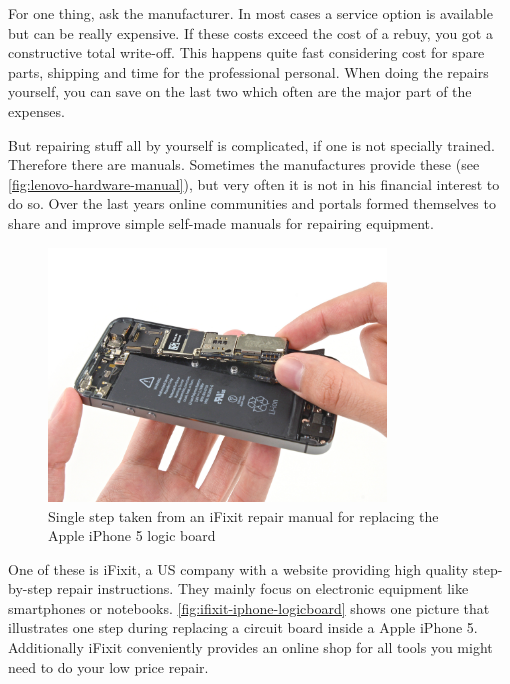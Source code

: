 	
	For one thing, ask the manufacturer. In most cases a service option is available but can be really expensive. If these costs exceed the cost of a rebuy, you got a constructive total write-off. This happens quite fast considering cost for spare parts, shipping and time for the professional personal. When doing the repairs yourself, you can save on the last two which often are the major part of the expenses.
	
	But repairing stuff all by yourself is complicated, if one is not specially trained. Therefore there are manuals. Sometimes the manufactures provide these (see \autoref{fig:lenovo-hardware-manual}), but very often it is not in his financial interest to do so. Over the last years online communities and portals formed themselves to share and improve simple self-made manuals for repairing equipment.
	
	\begin{figure}[H]
		\includegraphics[width=0.8\textwidth]{../images/ifixit-iphone-logicboard.jpg}
		\centering
		\caption[Single step taken from an iFixit repair manual for replacing the Apple iPhone 5 logic board]{Single step taken from an iFixit repair manual for replacing the Apple iPhone 5 logic board\footnotemark}
		\label{fig:ifixit-iphone-logicboard}
	\end{figure}
	
	One of these is iFixit, a US company with a website providing high quality step-by-step repair instructions. They mainly focus on electronic equipment like smartphones or notebooks. \autoref{fig:ifixit-iphone-logicboard} shows one picture that illustrates one step during replacing a circuit board inside a Apple iPhone 5. Additionally iFixit conveniently provides an online shop for all tools you might need to do your low price repair.
	
